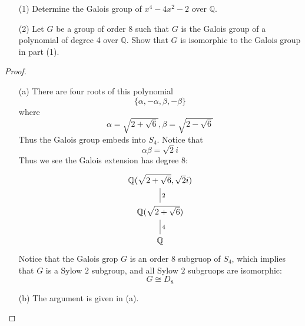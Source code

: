 \begin{prob}[F2016-Q4]
    \phantom{text}
    \begin{itemize}
        \item[(1)] Determine the Galois group of \(x^{4}-4x^{2}-2\) over \(\mathbb{Q}\).
        \item[(2)] Let \(G\) be a group of order 8 such that \(G\) is the Galois group of a polynomial of degree 4 over \(\mathbb{Q}\). Show that \(G\) is isomorphic to the Galois group in part (1).
    \end{itemize}
\end{prob}
\begin{proof}
    \begin{itemize}
        \item[(a)] There are four roots of this polynomial 
        \begin{equation*}
            \{\alpha, -\alpha, \beta, -\beta\}
        \end{equation*}
        where 
        \begin{equation*}
            \alpha=\sqrt{2+\sqrt{6}}, \beta=\sqrt{2-\sqrt{6}}
        \end{equation*}
        Thus the Galois group embeds into $S_4$. Notice that 
        \begin{equation*}
            \alpha\beta=\sqrt{2}i
        \end{equation*}
        Thus we see the Galois extension has degree $8$:
        \[\begin{tikzcd}
            {\mathbb{Q}(\sqrt{2+\sqrt{6}},\sqrt{2}i)} \\
            {\mathbb{Q}(\sqrt{2+\sqrt{6}})} \\
            {\mathbb{Q}}
            \arrow["2", no head, from=1-1, to=2-1]
            \arrow["4", no head, from=2-1, to=3-1]
        \end{tikzcd}\]
        Notice that the Galois grop $G$ is an order $8$ subgruop of $S_4$, which implies that $G$ is a Sylow $2$ subgroup, and all Sylow $2$ subgruops are isomorphic: 
        \begin{equation*}
            G\cong D_8
        \end{equation*}

        \item[(b)] The argument is given in (a).
    \end{itemize}
\end{proof}


